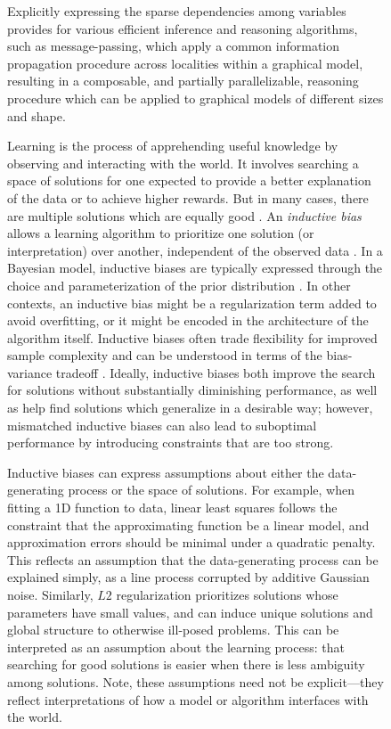 \begin{figure}[t!]
\begin{infobox}
Explicitly expressing the sparse dependencies among variables provides for various efficient inference and reasoning algorithms, such as message-passing, which apply a common information propagation procedure across localities within a graphical model, resulting in a composable, and partially parallelizable, reasoning procedure which can be applied to graphical models of different sizes and shape.
\label{box:rr}
\end{infobox}
\end{figure}

\begin{figure}[t!]
\begin{infobox}
Learning is the process of apprehending useful knowledge by observing and interacting with the world. It involves searching a space of solutions for one expected to provide a better explanation of the data or to achieve higher rewards. But in many cases, there are multiple solutions which are equally good \citep{goodman1965new}. An \emph{inductive bias} allows a learning algorithm to prioritize one solution (or interpretation) over another, independent of the observed data \citep{mitchell1980need}.
In a Bayesian model, inductive biases are typically expressed through the choice and parameterization of the prior distribution \citep{griffiths2010probabilistic}.
In other contexts, an inductive bias might be a regularization term \citep{mcclelland1994interaction} added to avoid overfitting, or it might be encoded in the architecture of the algorithm itself.
Inductive biases often trade flexibility for improved sample complexity and can be understood in terms of the bias-variance tradeoff \citep{geman1992neural}.
Ideally, inductive biases both improve the search for solutions without substantially diminishing performance, as well as help find solutions which generalize in a desirable way; however, mismatched inductive biases can also lead to suboptimal performance by introducing constraints that are too strong.

\vspace{1em}
Inductive biases can express assumptions about either the data-generating process or the space of solutions. For example, when fitting a 1D function to data, linear least squares follows the constraint that the approximating function be a linear model, and approximation errors should be minimal under a quadratic penalty. This reflects an assumption that the data-generating process can be explained simply, as a line process corrupted by additive Gaussian noise. Similarly, $L2$ regularization prioritizes solutions whose parameters have small values, and can induce unique solutions and global structure to otherwise ill-posed problems. This can be interpreted as an assumption about the learning process: that searching for good solutions is easier when there is less ambiguity among solutions. Note, these assumptions need not be explicit---they reflect interpretations of how a model or algorithm interfaces with the world.
\label{box:inductive-biases}
\end{infobox}
\end{figure}

